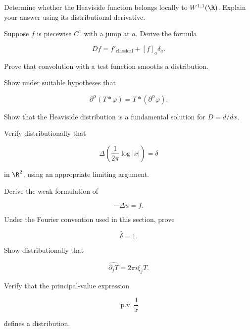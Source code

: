 \begin{exercise}[2]
Determine whether the Heaviside function belongs locally to
\(W^{1,1}(\R)\).
Explain your answer using its distributional derivative.
\end{exercise}

\begin{exercise}[3]
Suppose \(f\) is piecewise \(C^1\) with a jump at \(a\). Derive the
formula

\[
Df
=
f'_{\mathrm{classical}}
+
[f]_a\delta_a.
\]
\end{exercise}

\begin{exercise}[3]
Prove that convolution with a test function smooths a distribution.
\end{exercise}

\begin{exercise}[3]
Show under suitable hypotheses that

\[
\partial^\alpha(T*\varphi)
=
T*(\partial^\alpha\varphi).
\]
\end{exercise}

\begin{exercise}[3]
Show that the Heaviside distribution is a fundamental solution for
\(D=d/dx\).
\end{exercise}

\begin{exercise}[3]
Verify distributionally that

\[
\Delta
\left(
\frac{1}{2\pi}\log|x|
\right)
=
\delta
\]

in \(\R^2\), using an appropriate limiting argument.
\end{exercise}

\begin{exercise}[3]
Derive the weak formulation of

\[
-\Delta u=f.
\]
\end{exercise}

\begin{exercise}[3]
Under the Fourier convention used in this section, prove

\[
\widehat{\delta}=1.
\]
\end{exercise}

\begin{exercise}[3]
Show distributionally that

\[
\widehat{\partial_jT}
=
2\pi i\xi_j\widehat{T}.
\]
\end{exercise}

\begin{exercise}[3]
Verify that the principal-value expression

\[
\operatorname{p.v.}\frac{1}{x}
\]

defines a distribution.
\end{exercise}

